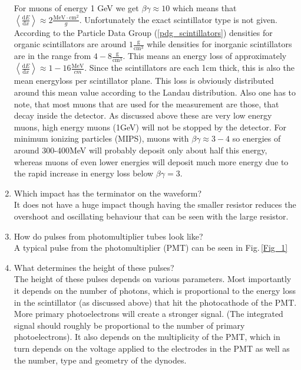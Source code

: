 \begin{enumerate}
For muons of energy 1 GeV we get $\beta\gamma\approx10$ which means that $\left\langle \frac{\mathrm{d}E}{\mathrm{d}x}\right\rangle \approx 2 \frac{\text{MeV}\cdot\text{cm}^2}{g}$. Unfortunately the exact scintillator type is not given. According to the Particle Data Group (\ref{pdg_scintillators}) densities for organic scintillators are around $1 \frac{\text{g}}{\text{cm}^3}	$ while densities for inorganic scintillators are in the range from $4-8 \frac{\text{g}}{\text{cm}^3}$. This means an energy loss of approximately $\left\langle \frac{\mathrm{d}E}{\mathrm{d}x}\right\rangle \approx 1-16 \frac{\text{MeV}}{cm}$. Since the scintillators are each 1cm thick, this is also the mean energyloss per scintillator plane. This loss is obviously distributed around this mean value according to the Landau distribution. Also one has to note, that most muons that are used for the measurement are those, that decay inside the detector. As discussed above  these are very low energy muons, high energy muons (1GeV) will not be stopped by the detector. For minimum ionizing particles (MIPS), muons with $\beta\gamma\approx 3-4$ so energies of around 300-400MeV will probably deposit only about half this energy, whereas muons of even lower energies will deposit much more energy due to the rapid increase in energy loss below $\beta\gamma=3$.  
\item Which impact has the terminator on the waveform?\\
It does not have a huge impact though having the smaller resistor reduces the overshoot and oscillating behaviour that can be seen with the large resistor. 
\item How do pulses from photomultiplier tubes look like?\\ 
A typical pulse from the photomultiplier (PMT) can be seen in Fig.\,\ref{Fig_1}
\item What determines the height of these pulses?\\
The height of these pulses depends on various parameters. Most importantly it depends on the number of photons, which is proportional to the energy loss in the scintillator (as discussed above) that hit the photocathode of the PMT. More primary photoelectrons will create a stronger signal. (The integrated signal should roughly be proportional to the number of primary photoelectrons). It also depends on the multiplicity of the PMT, which in turn depends on the voltage applied to the electrodes in the PMT as well as the number, type and geometry of the dynodes.
\end{enumerate}

